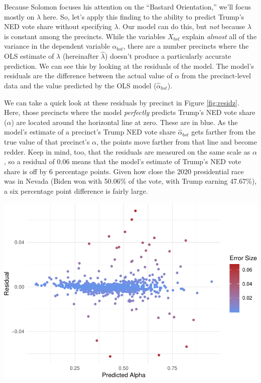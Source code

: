 \documentclass[12pt]{article}
\begin{document}
Because Solomon focuses his attention on the ``Bastard Orientation,'' we'll focus mostly on \(\lambda\) here. So, let's apply this finding to the ability to predict Trump's NED vote share without specifying \(\lambda\). Our model can do this, but \emph{not} because \(\lambda\) is constant among the precincts. While the variables \(X_{bst}\) explain \emph{almost} all of the variance in the dependent variable \(\alpha_{bst}\), there are a number precincts where the OLS estimate of \(\lambda\) (hereinafter \(\hat{\lambda}\)) doesn't produce a particularly accurate prediction. We can see this by looking at the residuals of the model. The model's residuals are the difference between the actual value of \(\alpha\) from the precinct-level data and the value predicted by the OLS model (\(\hat{\alpha}_{bst}\)).

We can take a quick look at these residuals by precinct in Figure \ref{fig:residz}. Here, those precincts where the model \emph{perfectly} predicts Trump's NED vote share (\(\alpha\)) are located around the horizontal line at zero. These are in blue. As the model's estimate of a precinct's Trump NED vote share \(\hat{\alpha}_{bst}\) gets farther from the true value of that precinct's \(\alpha\), the points move farther from that line and become redder. Keep in mind, too, that the residuals are measured on the same scale as \(\alpha\), so a residual of 0.06 means that the model's estimate of Trump's NED vote share is off by 6 percentage points. Given how close the 2020 presidential race was in Nevada (Biden won with 50.06\% of the vote, with Trump earning 47.67\%), a six percentage point difference is fairly large.

\includegraphics{Report_files/figure-latex/residz-1.pdf}
\end{document}
